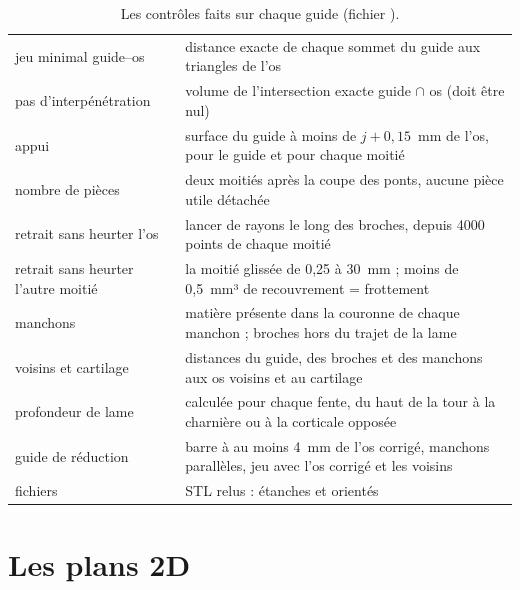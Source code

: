 \begin{table}[htbp]
\centering\small
\caption{Les contrôles faits sur chaque guide (fichier ).}
\label{tab:controles}
\begin{tabularx}{\linewidth}{L{4.2cm}Y}
\toprule
{} &  \\
\midrule
jeu minimal guide--os & distance exacte de chaque sommet du guide aux triangles de l'os \\
pas d'interpénétration & volume de l'intersection exacte guide $\cap$ os (doit être nul) \\
appui & surface du guide à moins de $j + 0{,}15$~mm de l'os, pour le guide et pour chaque moitié \\
nombre de pièces & deux moitiés après la coupe des ponts, aucune pièce utile détachée \\
retrait sans heurter l'os & lancer de rayons le long des broches, depuis 4000 points de chaque moitié \\
retrait sans heurter l'autre moitié & la moitié glissée de 0,25 à 30~mm ; moins de 0,5~mm³ de recouvrement = frottement \\
manchons & matière présente dans la couronne de chaque manchon ; broches hors du trajet de la lame \\
voisins et cartilage & distances du guide, des broches et des manchons aux os voisins et au cartilage \\
profondeur de lame & calculée pour chaque fente, du haut de la tour à la charnière ou à la corticale opposée \\
guide de réduction & barre à au moins 4~mm de l'os corrigé, manchons parallèles, jeu avec l'os corrigé et les voisins \\
fichiers & STL relus : étanches et orientés \\
\bottomrule
\end{tabularx}
\end{table}

\section{Les plans 2D}

